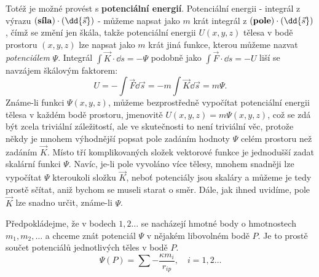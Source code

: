     Totéž je možné provést s \textbf{potenciální energií}. Potenciální energii - integrál z výrazu 
    \((\text{\textbf{síla}})\cdot(\dd{\vec{s}})\) - můžeme napsat jako \(m\) krát integrál z 
    \((\text{\textbf{pole}})\cdot(\dd{\vec{s}})\), čímž se změní jen škála, takže potenciální 
    energii \(U(x, y, z)\) tělesa v bodě prostoru \((x, y, z)\) lze napsat jako \(m\) krát jiná 
    funkce, kterou můžeme nazvat \emph{potenciálem} \(\Psi\). Integrál \(\int\vec{K}\cdot\dd{s}= 
    -\Psi\) podobně jako \(\int\vec{F}\cdot\dd{s}= -U\) liší se navzájem škálovým faktorem:
    \begin{equation}\label{fyz:eq002}
      U = -\int\vec{F}\dd{\vec{s}} = -m\int\vec{K}\dd{\vec{s}} = m\Psi.
    \end{equation}
    Známe-li funkci \(\Psi(x, y, z)\), můžeme bezprostředně vypočítat potenciální energii tělesa v 
    každém bodě prostoru, jmenovitě \(U(x, y, z) = m\Psi(x, y, z)\), což se zdá být zcela triviální 
    záležitostí, ale ve skutečnosti to není triviální věc, protože někdy je mnohem výhodnější 
    popsat pole zadáním hodnoty \(\Psi\) celém prostoru než zadáním \(\vec{K}\). Místo tří 
    komplikovaných složek vektorové funkce je jednodušší zadat skalární funkci \(\Psi\). Navíc, 
    je-li pole vyvoláno více tělesy, mnohem snadněji lze vypočítat \(\Psi\) kteroukoli složku 
    \(\vec{K}\), neboť potenciály jsou skaláry a můžeme je tedy prostě sčítat, aniž bychom se 
    museli starat o směr. Dále, jak ihned uvidíme, pole \(\vec{K}\) lze snadno určit, známe-li 
    \(\Psi\).
    
    Předpokládejme, že v bodech \(1, 2 \ldots\) se nacházejí hmotné body o hmotnostech \(m_1, m_2, 
    \ldots\) a chceme znát potenciál \(\Psi\) v nějakém libovolném bodě \(P\). Je to prostě součet 
    potenciálů jednotlivých těles v bodě \(P\).
    \begin{equation}\label{fyz:eq003}
      \Psi(P) = \sum-\frac{\kappa m_i}{r_{ip}}, \quad i = 1, 2 \ldots
    \end{equation}
    
